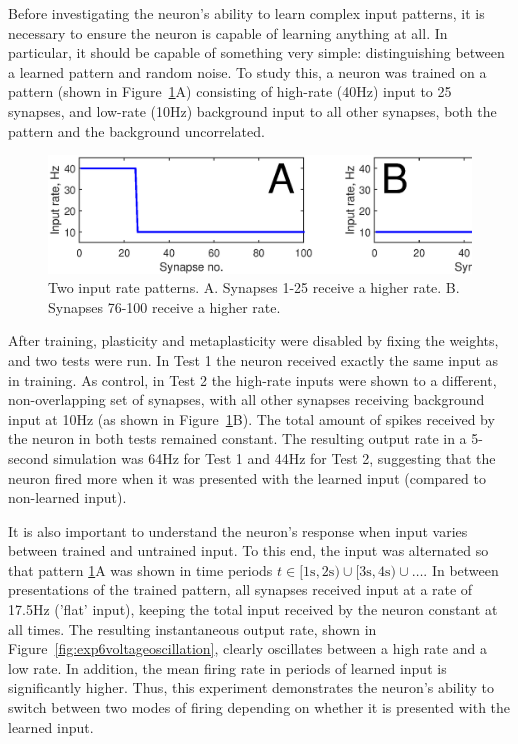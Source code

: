 \documentclass[a4paper,12pt]{report}
\theoremstyle{definition}
\begin{document}

Before investigating the neuron's ability to learn complex input patterns, it is necessary to ensure the neuron is capable of learning anything at all. In particular, it should be capable of something very simple: distinguishing between a learned pattern and random noise. To study this, a neuron was trained on a pattern (shown in Figure~\ref{fig:exp2_inputpatterns}A) consisting of high-rate (40Hz) input to 25 synapses, and low-rate (10Hz) background input to all other synapses, both the pattern and the background uncorrelated.

\begin{figure}[h]
    \centering
    \includegraphics[width=\textwidth]{figures/exp2_inputpatterns.eps}
    \caption{Two input rate patterns. A. Synapses 1-25 receive a higher rate. B. Synapses 76-100 receive a higher rate.}
    \label{fig:exp2_inputpatterns}
\end{figure}

After training, plasticity and metaplasticity were disabled by fixing the weights, and two tests were run. In Test 1 the neuron received exactly the same input as in training. As control, in Test 2 the high-rate inputs were shown to a different, non-overlapping set of synapses, with all other synapses receiving background input at 10Hz (as shown in Figure~\ref{fig:exp2_inputpatterns}B). The total amount of spikes received by the neuron in both tests remained constant. The resulting output rate in a 5-second simulation was 64Hz for Test 1 and 44Hz for Test 2, suggesting that the neuron fired more when it was presented with the learned input (compared to non-learned input).


It is also important to understand the neuron's response when input varies between trained and untrained input. To this end, the input was alternated so that pattern \ref{fig:exp2_inputpatterns}A was shown in time periods $t \in [1\mathrm{s}, 2\mathrm{s}) \cup [3\mathrm{s}, 4\mathrm{s}) \cup \ldots $. In between presentations of the trained pattern, all synapses received input at a rate of 17.5Hz ('flat' input), keeping the total input received by the neuron constant at all times. The resulting instantaneous output rate, shown in Figure~\ref{fig:exp6voltageoscillation}, clearly oscillates between a high rate and a low rate. In addition, the mean firing rate in periods of learned input is significantly higher. Thus, this experiment demonstrates the neuron's ability to switch between two modes of firing depending on whether it is presented with the learned input.
\end{document}
